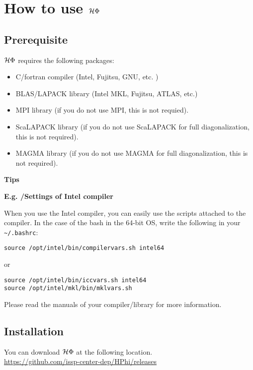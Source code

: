 \chapter{How to use $\mathcal{H} \Phi$}
\label{Ch:HowTo}

\section{Prerequisite}

$\mathcal{H} \Phi$ requires the following packages:
\begin{itemize}
\item C/fortran compiler (Intel, Fujitsu, GNU, etc. )
\item BLAS/LAPACK library (Intel MKL, Fujitsu, ATLAS, etc.)
\item MPI library (if you do not use MPI, this is not requied).
\item ScaLAPACK library (if you do not use ScaLAPACK for full diagonalization, this is not required).
\item MAGMA library (if you do not use MAGMA for full diagonalization, this is not required).
\end{itemize}

\begin{screen}
\Large 
{\bf Tips}
\normalsize

{\bf E.g. /Settings of Intel compiler}

When you use the Intel compiler, you can easily use the scripts attached to the compiler.
In the case of the bash in the 64-bit OS, write the following in your \verb|~/.bashrc|:
\begin{verbatim}
source /opt/intel/bin/compilervars.sh intel64
\end{verbatim}
or
\begin{verbatim}
source /opt/intel/bin/iccvars.sh intel64
source /opt/intel/mkl/bin/mklvars.sh
\end{verbatim}

Please read the manuals of your compiler/library for more information.

\end{screen}

\section{Installation}

You can download $\mathcal{H} \Phi$ at the following location.\\
\url{https://github.com/issp-center-dep/HPhi/releases}

